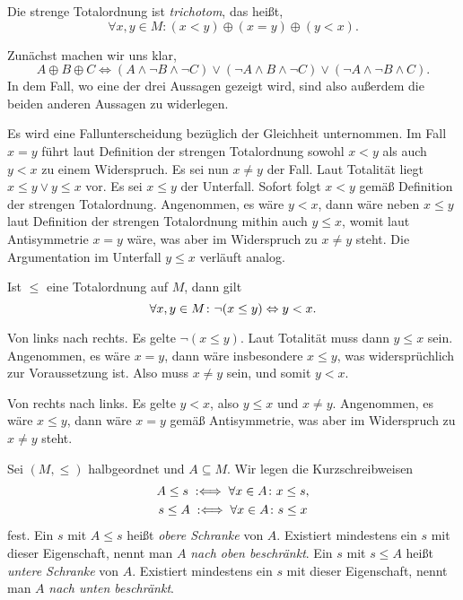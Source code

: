 \begin{Satz}
Die strenge Totalordnung ist \emph{trichotom},
das heißt,
\[\forall x,y\in M\colon (x<y) \oplus (x=y)\oplus (y<x).\]
\end{Satz}
\begin{Beweis}
Zunächst machen wir uns klar,
\[A\oplus B\oplus C\iff (A\land\lnot B\land\lnot C)\lor
(\lnot A\land B\land\lnot C)\lor (\lnot A\land \lnot B\land C).\]
In dem Fall, wo eine der drei Aussagen gezeigt wird, sind also
außerdem die beiden anderen Aussagen zu widerlegen.

Es wird eine Fallunterscheidung bezüglich der Gleichheit unternommen.
Im Fall $x=y$ führt laut Definition der strengen Totalordnung
sowohl $x<y$ als auch $y<x$ zu einem Widerspruch. Es sei nun $x\ne y$
der Fall. Laut Totalität liegt $x\le y\lor y\le x$ vor.
Es sei $x\le y$ der Unterfall. Sofort folgt $x<y$ gemäß Definition
der strengen Totalordnung. Angenommen, es wäre $y<x$, dann wäre neben
$x\le y$ laut Definition der strengen Totalordnung mithin auch $y\le x$,
womit laut Antisymmetrie $x=y$ wäre, was aber im Widerspruch zu $x\ne y$
steht. Die Argumentation im Unterfall $y\le x$ verläuft analog.\,\qedsymbol
\end{Beweis}

\begin{Satz}
Ist $\le$ eine Totalordnung auf $M$, dann gilt
\[\forall x,y\in M\colon \lnot (x \le y) \Leftrightarrow y < x.\]
\end{Satz}
\begin{Beweis}
Von links nach rechts. Es gelte $\lnot (x\le y)$. Laut Totalität muss
dann $y\le x$ sein. Angenommen, es wäre $x=y$, dann wäre insbesondere
$x\le y$, was widersprüchlich zur Voraussetzung ist. Also muss
$x\ne y$ sein, und somit $y<x$.

Von rechts nach links. Es gelte $y<x$, also $y\le x$ und $x\ne y$.
Angenommen, es wäre $x\le y$, dann wäre $x=y$ gemäß Antisymmetrie, was
aber im Widerspruch zu $x\ne y$ steht.\,\qedsymbol
\end{Beweis}

\noindent
Sei $(M,\le)$ halbgeordnet und $A\subseteq M$. Wir legen die
Kurzschreibweisen
\begin{gather*}
A\le s\;:\Longleftrightarrow\;\forall x\in A\colon x\le s,\\
s\le A\;:\Longleftrightarrow\;\forall x\in A\colon s\le x
\end{gather*}
fest. Ein $s$ mit $A\le s$ heißt \emph{obere Schranke} von $A$. Existiert
mindestens ein $s$ mit dieser Eigenschaft, nennt man $A$ \emph{nach oben
beschränkt}. Ein $s$ mit $s\le A$ heißt \emph{untere Schranke} von $A$.
Existiert mindestens ein $s$ mit dieser Eigenschaft, nennt man $A$
\emph{nach unten beschränkt}.

